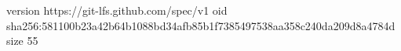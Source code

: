 version https://git-lfs.github.com/spec/v1
oid sha256:581100b23a42b64b1088bd34afb85b1f7385497538aa358c240da209d8a4784d
size 55
